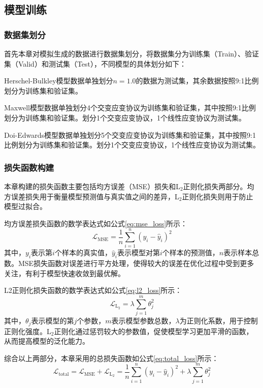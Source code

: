 \subsection{模型训练}
\subsubsection{数据集划分}
首先本章对模拟生成的数据进行数据集划分，将数据集分为训练集（Train）、验证集（Valid）和测试集（Test），不同模型的具体划分如下：

Herschel-Bulkley模型数据单独划分$n=1.0$的数据为测试集，其余数据按照9:1比例划分为训练集和验证集。

Maxwell模型数据单独划分4个交变应变协议为训练集和验证集，其中按照9:1比例划分为训练集和验证集。划分1个交变应变协议，1个线性应变协议为测试集。

Doi-Edwards模型数据单独划分5个交变应变协议为训练集和验证集，其中按照9:1比例划分为训练集和验证集。划分1个交变应变协议，1个线性应变协议为测试集。

\subsubsection{损失函数构建}
本章构建的损失函数主要包括均方误差（MSE）损失和L$_2$正则化损失两部分。均方误差损失用于衡量模型预测值与真实值之间的差异，L$_2$正则化损失则用于防止模型过拟合。

均方误差损失函数的数学表达式如公式\eqref{eq:mse_loss}所示：
\begin{equation}
  \mathcal{L}_{\text{MSE}} = \frac{1}{n} \sum_{i=1}^{n} (y_i - \hat{y}_i)^2 \label{eq:mse_loss}
\end{equation}
其中，$y_i$表示第$i$个样本的真实值，$\hat{y}_i$表示模型对第$i$个样本的预测值，$n$表示样本总数。MSE损失函数对误差进行平方处理，使得较大的误差在优化过程中受到更多关注，有利于模型快速收敛到最优解。

L2正则化损失函数的数学表达式如公式\eqref{eq:l2_loss}所示：
\begin{equation}
  \mathcal{L}_{\text{L$_2$}} = \lambda \sum_{j=1}^{m} \theta_j^2 \label{eq:l2_loss}
\end{equation}
其中，$\theta_j$表示模型的第$j$个参数，$m$表示模型参数总数，$\lambda$为正则化系数，用于控制正则化强度。L$_2$正则化通过惩罚较大的参数值，促使模型学习更加平滑的函数，从而提高模型的泛化能力。

综合以上两部分，本章采用的总损失函数如公式\eqref{eq:total_loss}所示：
\begin{equation}
  \mathcal{L}_{\text{total}} = \mathcal{L}_{\text{MSE}} + \mathcal{L}_{\text{L$_2$}} = \frac{1}{n} \sum_{i=1}^{n} (y_i - \hat{y}_i)^2 + \lambda \sum_{j=1}^{m} \theta_j^2 \label{eq:total_loss}
\end{equation}

